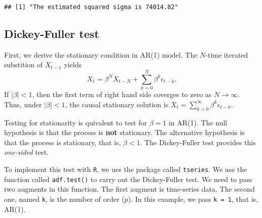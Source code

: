 \documentclass[
  12pt,
]{article}
\newenvironment{Shaded}{\begin{snugshade}}{\end{snugshade}}
\newcommand{\DataTypeTok}[1]{\textcolor[rgb]{0.13,0.29,0.53}{#1}}
\newcommand{\DecValTok}[1]{\textcolor[rgb]{0.00,0.00,0.81}{#1}}
\newcommand{\KeywordTok}[1]{\textcolor[rgb]{0.13,0.29,0.53}{\textbf{#1}}}
\newcommand{\NormalTok}[1]{#1}
\newcommand{\OperatorTok}[1]{\textcolor[rgb]{0.81,0.36,0.00}{\textbf{#1}}}
\newcommand{\StringTok}[1]{\textcolor[rgb]{0.31,0.60,0.02}{#1}}
\begin{document}
\begin{Shaded}
\end{Shaded}

\begin{verbatim}
## [1] "The estimated squared sigma is 74014.82"
\end{verbatim}

\hypertarget{dickey-fuller-test}{%
\subsection{Dickey-Fuller test}\label{dickey-fuller-test}}

First, we derive the stationary condition in AR(1) model.
The \(N\)-time iterated substition of \(X_{t-1}\) yields
\[ X_t = \beta^N X_{t-N} + \sum_{k = 0}^N \beta^k \epsilon_{t-k}. \]
If \(|\beta| < 1\), then the first term of right hand side coverges to zero as \(N \to \infty\).
Thus, under \(|\beta| < 1\), the causal stationary solution is \(X_t = \sum_{k=0}^{\infty} \beta^k \epsilon_{t-k}\).

Testing for stationarity is quivalent to test for \(\beta = 1\) in AR(1).
The null hypothesis is that the process is \textbf{not} stationary.
The alternative hypothesis is that the process is stationary, that is, \(\beta < 1\).
The Dickey-Fuller test provides this \emph{one-sided} test.

To implement this test with \texttt{R},
we ues the package called \texttt{tseries}.
We use the function called \texttt{adf.test()} to carry out the Dickey-Fuller test.
We need to pass two augments in this function.
The first augment is time-series data.
The second one, named \texttt{k}, is the number of order (\(p\)).
In this example, we pass \texttt{k\ =\ 1}, that is, AR(1).

\begin{Shaded}
\end{Shaded}
\end{document}

